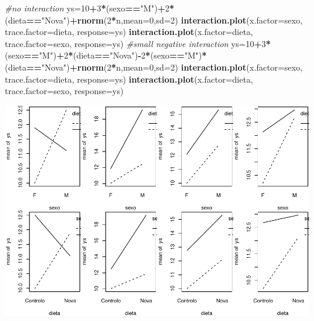 \documentclass[
]{book}
\newenvironment{Shaded}{\begin{snugshade}}{\end{snugshade}}
\newcommand{\AttributeTok}[1]{\textcolor[rgb]{0.13,0.29,0.53}{#1}}
\newcommand{\CommentTok}[1]{\textcolor[rgb]{0.56,0.35,0.01}{\textit{#1}}}
\newcommand{\DecValTok}[1]{\textcolor[rgb]{0.00,0.00,0.81}{#1}}
\newcommand{\FunctionTok}[1]{\textcolor[rgb]{0.13,0.29,0.53}{\textbf{#1}}}
\newcommand{\NormalTok}[1]{#1}
\newcommand{\OtherTok}[1]{\textcolor[rgb]{0.56,0.35,0.01}{#1}}
\newcommand{\SpecialCharTok}[1]{\textcolor[rgb]{0.81,0.36,0.00}{\textbf{#1}}}
\newcommand{\StringTok}[1]{\textcolor[rgb]{0.31,0.60,0.02}{#1}}
\begin{document}
\begin{Shaded}
\begin{Highlighting}[]
\CommentTok{\#no interaction}
\NormalTok{ys}\OtherTok{=}\DecValTok{10}\SpecialCharTok{+}\DecValTok{3}\SpecialCharTok{*}\NormalTok{(sexo}\SpecialCharTok{==}\StringTok{"M"}\NormalTok{)}\SpecialCharTok{+}\DecValTok{2}\SpecialCharTok{*}\NormalTok{(dieta}\SpecialCharTok{==}\StringTok{"Nova"}\NormalTok{)}\SpecialCharTok{+}\FunctionTok{rnorm}\NormalTok{(}\DecValTok{2}\SpecialCharTok{*}\NormalTok{n,}\AttributeTok{mean=}\DecValTok{0}\NormalTok{,}\AttributeTok{sd=}\DecValTok{2}\NormalTok{)}
\FunctionTok{interaction.plot}\NormalTok{(}\AttributeTok{x.factor=}\NormalTok{sexo, }\AttributeTok{trace.factor=}\NormalTok{dieta, }\AttributeTok{response=}\NormalTok{ys)}
\FunctionTok{interaction.plot}\NormalTok{(}\AttributeTok{x.factor=}\NormalTok{dieta, }\AttributeTok{trace.factor=}\NormalTok{sexo, }\AttributeTok{response=}\NormalTok{ys)}
\CommentTok{\#small negative interaction}
\NormalTok{ys}\OtherTok{=}\DecValTok{10}\SpecialCharTok{+}\DecValTok{3}\SpecialCharTok{*}\NormalTok{(sexo}\SpecialCharTok{==}\StringTok{"M"}\NormalTok{)}\SpecialCharTok{+}\DecValTok{2}\SpecialCharTok{*}\NormalTok{(dieta}\SpecialCharTok{==}\StringTok{"Nova"}\NormalTok{)}\SpecialCharTok{{-}}\DecValTok{2}\SpecialCharTok{*}\NormalTok{(sexo}\SpecialCharTok{==}\StringTok{"M"}\NormalTok{)}\SpecialCharTok{*}\NormalTok{(dieta}\SpecialCharTok{==}\StringTok{"Nova"}\NormalTok{)}\SpecialCharTok{+}\FunctionTok{rnorm}\NormalTok{(}\DecValTok{2}\SpecialCharTok{*}\NormalTok{n,}\AttributeTok{mean=}\DecValTok{0}\NormalTok{,}\AttributeTok{sd=}\DecValTok{2}\NormalTok{)}
\FunctionTok{interaction.plot}\NormalTok{(}\AttributeTok{x.factor=}\NormalTok{sexo, }\AttributeTok{trace.factor=}\NormalTok{dieta, }\AttributeTok{response=}\NormalTok{ys)}
\FunctionTok{interaction.plot}\NormalTok{(}\AttributeTok{x.factor=}\NormalTok{dieta, }\AttributeTok{trace.factor=}\NormalTok{sexo, }\AttributeTok{response=}\NormalTok{ys)}
\end{Highlighting}
\end{Shaded}

\includegraphics{ECOMODbook_files/figure-latex/a11.2-1.pdf}
\end{document}

